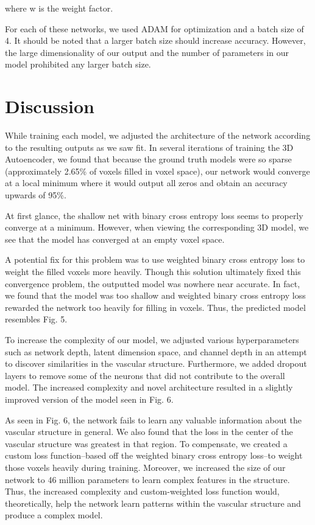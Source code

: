 \documentclass[conference, 10pt]{IEEEtran}
\begin{document}
where w is the weight factor.

For each of these networks, we used ADAM for optimization and a batch size of 4. It should be noted that a larger batch size should increase accuracy. However, the large dimensionality of our output and the number of parameters in our model prohibited any larger batch size.

\section{Discussion}
While training each model, we adjusted the architecture of the network according to the resulting outputs as we saw fit. In several iterations of training the 3D Autoencoder, we found that because the ground truth models were so sparse (approximately 2.65\% of voxels filled in voxel space), our network would converge at a local minimum where it would output all zeros and obtain an accuracy upwards of 95\%.



At first glance, the shallow net with binary cross entropy loss seems to
properly converge at a minimum. However, when viewing the corresponding 3D
model, we see that the model has converged at an empty voxel space.

A potential fix for this problem was to use weighted binary cross entropy loss
to weight the filled voxels more heavily. Though this solution ultimately fixed
this convergence problem, the outputted model was nowhere near accurate. In
fact, we found that the model was too shallow and weighted binary cross entropy 
loss rewarded the network too heavily for filling in voxels. Thus, the
predicted model resembles Fig. 5.


To increase the complexity of our model, we adjusted various hyperparameters 
such as network depth, latent dimension space, and channel depth in an attempt
to discover similarities in the vascular structure. Furthermore, we added
dropout layers to remove some of the neurons that did not contribute to 
the overall model. The increased complexity and novel architecture resulted in
a slightly improved version of the model seen in Fig. 6. 


As seen in Fig. 6, the network fails to learn any valuable information about 
the vascular structure in general. We also found that the loss in the center of 
the vascular structure was greatest in that region. To compensate, we created a 
custom loss function--based off the weighted binary cross entropy loss--to 
weight those voxels heavily during training. Moreover, we increased the size of 
our network to 46 million parameters to learn complex features in the 
structure. Thus, the increased complexity and custom-weighted loss function 
would, theoretically, help the network learn patterns within the vascular 
structure and produce a complex model. 
\end{document}
